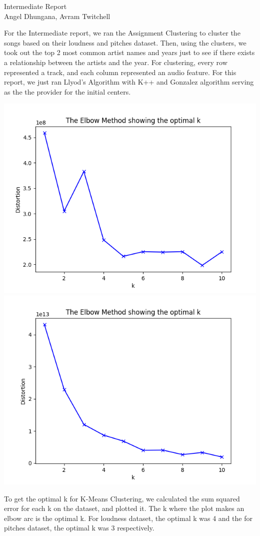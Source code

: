 \documentclass[11pt]{article}
\begin{document}
\begin{center}
    \Large{Intermediate Report }\\
    \large{Angel Dhungana, Avram Twitchell}
    
\end{center}
For the Intermediate report, we ran the Assignment Clustering to cluster the songs based on their loudness and pitches dataset. Then, using the clusters, we took out the top 2 most common artist names and years just to see if there exists a relationship between the artists and the year. For clustering, every row represented a track, and each column represented an audio feature. For this report, we just ran Llyod's Algorithm with K++ and Gonzalez algorithm serving as the the provider for the initial centers. 


\begin{center}
\includegraphics[scale=0.25]{assests/elbowloud.png}
\includegraphics[scale=0.25]{assests/elbowpitches.png}
\end{center}
To get the optimal k for K-Means Clustering, we calculated the sum squared error for each k on the dataset, and plotted it. The k where the plot makes an elbow arc is the optimal k. For loudness dataset, the optimal k was 4 and the for pitches dataset, the optimal k was 3 respectively.
\end{document}
